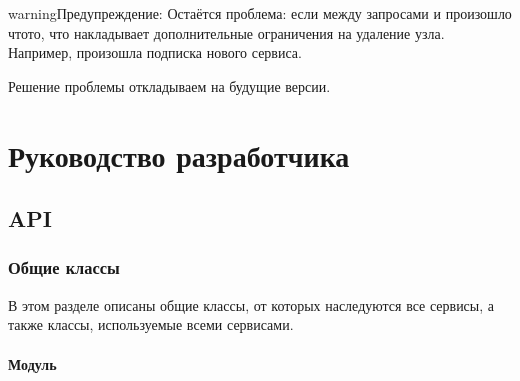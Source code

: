 \documentclass[a4paper,10pt,russian]{sphinxmanual}
\begin{document}
\begin{sphinxadmonition}{warning}{Предупреждение:}
\sphinxAtStartPar
Остаётся проблема: если между запросами  и 
произошло что\sphinxhyphen{}то, что накладывает дополнительные ограничения на удаление
узла. Например, произошла подписка нового сервиса.

\sphinxAtStartPar
Решение проблемы откладываем на будущие версии.
\end{sphinxadmonition}

\sphinxstepscope


\chapter{Руководство разработчика}
\label{\detokenize{developer:id1}}\label{\detokenize{developer::doc}}

\section{API}
\label{\detokenize{developer:api}}

\subsection{Общие классы}
\label{\detokenize{developer:id2}}
\sphinxAtStartPar
В этом разделе описаны общие классы, от которых наследуются все сервисы,
а также классы, используемые всеми сервисами.


\subsubsection{Модуль }
\label{\detokenize{developer:hierarchy}}
\end{document}
